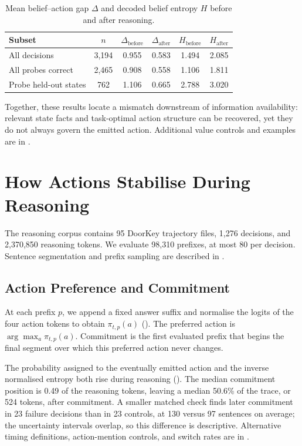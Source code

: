 \documentclass{article}
\begin{document}
\begin{table}[htbp]
\centering\small
\begin{tabular}{lccccc}
\toprule
Subset & $n$ & $\Delta_{\mathrm{before}}$ & $\Delta_{\mathrm{after}}$ & $H_{\mathrm{before}}$ & $H_{\mathrm{after}}$ \\
\midrule
All decisions & 3,194 & 0.955 & 0.583 & 1.494 & 2.085 \\
All probes correct & 2,465 & 0.908 & 0.558 & 1.106 & 1.811 \\
Probe held-out states & 762 & 1.106 & 0.665 & 2.788 & 3.020 \\
\bottomrule
\end{tabular}
\caption{Mean belief--action gap $\Delta$ and decoded belief entropy $H$ before and after reasoning.}
\label{tab:gap-pre-post}
\end{table}

Together, these results locate a mismatch downstream of information availability: relevant state facts and task-optimal action structure can be recovered, yet they do not always govern the emitted action. Additional value controls and examples are in .


\section{How Actions Stabilise During Reasoning}\label{sec:reasoning}
The reasoning corpus contains 95 DoorKey trajectory files, 1,276 decisions, and 2,370,850 reasoning tokens. We evaluate 98,310 prefixes, at most 80 per decision. Sentence segmentation and prefix sampling are described in .

\subsection{Action Preference and Commitment}\label{sec:commitment}
At each prefix $p$, we append a fixed answer suffix and normalise the logits of the four action tokens to obtain $\pi_{t,p}(a)$ (). The preferred action is $\arg\max_a\pi_{t,p}(a)$. Commitment is the first evaluated prefix that begins the final segment over which this preferred action never changes.

The probability assigned to the eventually emitted action and the inverse normalised entropy both rise during reasoning (). The median commitment position is 0.49 of the reasoning tokens, leaving a median 50.6\% of the trace, or 524 tokens, after commitment. A smaller matched check finds later commitment in 23 failure decisions than in 23 controls, at 130 versus 97 sentences on average; the uncertainty intervals overlap, so this difference is descriptive. Alternative timing definitions, action-mention controls, and switch rates are in .
\end{document}
